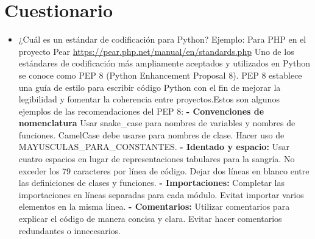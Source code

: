 \documentclass{article}
\begin{document}
\section{Cuestionario}
	\begin{itemize}
		\item{¿Cuál es un estándar de codificación para Python? Ejemplo: Para PHP en el proyecto Pear \url{https://pear.php.net/manual/en/standards.php}}
        Uno de los estándares de codificación más ampliamente aceptados y utilizados en Python se conoce como PEP 8 (Python Enhancement Proposal 8). PEP 8 establece una guía de estilo para escribir código Python con el fin de mejorar la legibilidad y fomentar la coherencia entre proyectos.Estos son algunos ejemplos de las recomendaciones del PEP 8:\newline
        \textbf{- Convenciones de nomenclatura}\newline
        Usar snake\_case para nombres de variables y nombres de funciones.\newline
        CamelCase debe usarse para nombres de clase.\newline
        Hacer uso de MAYUSCULAS\_PARA\_CONSTANTES.\newline
        \textbf{- Identado y espacio:}\newline
        Usar cuatro espacios en lugar de representaciones tabulares para la sangría.\newline
        No exceder los 79 caracteres por línea de código.\newline
        Dejar dos líneas en blanco entre las definiciones de clases y funciones.\newline
         \textbf{- Importaciones:}\newline
        Completar las importaciones en líneas separadas para cada módulo.\newline
        Evitat importar varios elementos en la misma línea.\newline
         \textbf{- Comentarios:}\newline
Utilizar comentarios para explicar el código de manera concisa y clara.\newline
Evitar hacer comentarios redundantes o innecesarios.\newline


\end{itemize}
\end{document}
